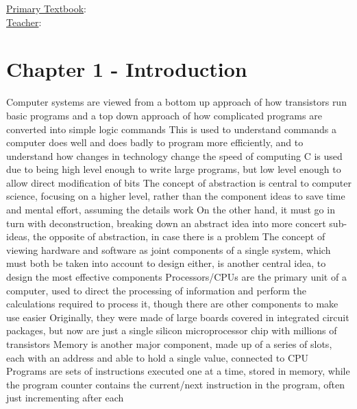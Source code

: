 \documentclass[11 pt, twoside]{article}
\newenvironment{outline*}
{
	\begin{outline}[enumerate]
	}
	{\end{outline}
}
\begin{document}
\title{}
\author{Avery Karlin}
\date{Fall 2015}
\newcommand{\textbook}{}
\newcommand{\teacher}{}

\maketitle
\newpage
\hypertarget{content}{\tableofcontents}
\vspace{11pt}
\noindent
\underline{Primary Textbook}: \textbook\\
\underline{Teacher}: \teacher
\newpage

\section{Chapter 1 - Introduction}
\begin{outline*}
\1 Computer systems are viewed from a bottom up approach of how transistors run basic programs and a top down approach of how complicated programs are converted into simple logic commands
\2 This is used to understand commands a computer does well and does badly to program more efficiently, and to understand how changes in technology change the speed of computing
\2 C is used due to being high level enough to write large programs, but low level enough to allow direct modification of bits
\1 The concept of abstraction is central to computer science, focusing on a higher level, rather than the component ideas to save time and mental effort, assuming the details work
\2 On the other hand, it must go in turn with deconstruction, breaking down an abstract idea into more concert sub-ideas, the opposite of abstraction, in case there is a problem
\1 The concept of viewing hardware and software as joint components of a single system, which must both be taken into account to design either, is another central idea, to design the most effective components
\1 Processors/CPUs are the primary unit of a computer, used to direct the processing of information and perform the calculations required to process it, though there are other components to make use easier
\2 Originally, they were made of large boards covered in integrated circuit packages, but now are just a single silicon microprocessor chip with millions of transistors
\2 Memory is another major component, made up of a series of slots, each with an address and able to hold a single value, connected to CPU
\2 Programs are sets of instructions executed one at a time, stored in memory, while the program counter contains the current/next instruction in the program, often just incrementing after each

\end{outline*}
\end{document}
